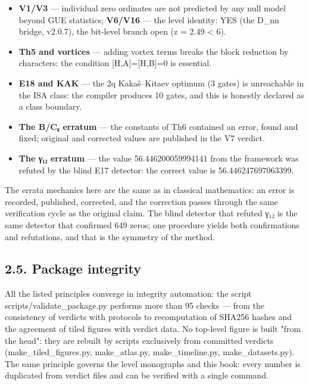 \documentclass[11pt,a4paper]{article}
\begin{document}
\begin{itemize}
  \item \textbf{V1/V3} — individual zero ordinates are not predicted by any null model beyond GUE statistics; \textbf{V6/V16} — the level identity: YES (the D\_nn bridge, v2.0.7), the bit-level branch open (z = 2.49 < 6).
  \item \textbf{Th5 and vortices} — adding vortex terms breaks the block reduction by characters: the condition [H,A]=[H,B]=0 is essential.
  \item \textbf{E18 and KAK} — the 2q Kakaš–Kitaev optimum (3 gates) is unreachable in the ISA class: the compiler produces 10 gates, and this is honestly declared as a class boundary.
  \item \textbf{The B/C₀ erratum} — the constants of Th6 contained an error, found and fixed; original and corrected values are published in the V7 verdict.
  \item \textbf{The γ₁₂ erratum} — the value 56.446200059994141 from the framework was refuted by the blind E17 detector: the correct value is 56.446247697063399.
\end{itemize}

The errata mechanics here are the same as in classical mathematics: an error is recorded, published, corrected, and the correction passes through the same verification cycle as the original claim. The blind detector that refuted γ₁₂ is the same detector that confirmed 649 zeros; one procedure yields both confirmations and refutations, and that is the symmetry of the method.

\subsection{2.5. Package integrity}

All the listed principles converge in integrity automation: the script scripts/validate\_package.py performs more than 95 checks — from the consistency of verdicts with protocols to recomputation of SHA256 hashes and the agreement of tiled figures with verdict data. No top-level figure is built "from the head": they are rebuilt by scripts exclusively from committed verdicts (make\_tiled\_figures.py, make\_atlas.py, make\_timeline.py, make\_datasets.py). The same principle governs the level monographs and this book: every number is duplicated from verdict files and can be verified with a single command.
\end{document}
